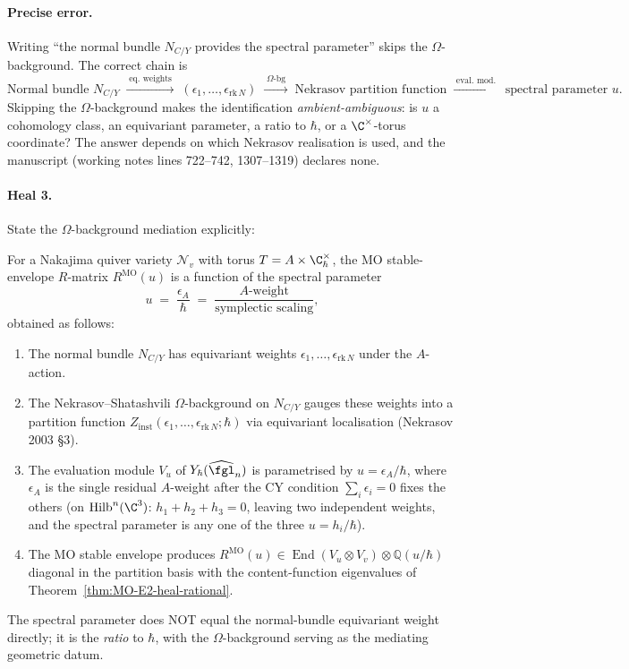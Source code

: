 \paragraph{Precise error.}  Writing ``the normal bundle $N_{C/Y}$
provides the spectral parameter'' skips the $\Omega$-background.
The correct chain is
\[
\text{Normal bundle } N_{C/Y} \;\xrightarrow{\;\text{eq.\ weights}\;}\;
(\epsilon_1, \ldots, \epsilon_{\mathrm{rk}\,N})
\;\xrightarrow{\;\Omega\text{-bg}\;}\;
\text{Nekrasov partition function}
\;\xrightarrow{\;\text{eval.\ mod.}\;}\;
\text{spectral parameter } u.
\]
Skipping the $\Omega$-background makes the identification
\emph{ambient-ambiguous}: is $u$ a cohomology class, an equivariant
parameter, a ratio to $\hbar$, or a $\C^\times$-torus coordinate?
The answer depends on which Nekrasov realisation is used, and the
manuscript (working notes lines 722--742, 1307--1319) declares none.

\paragraph{Heal 3.}  State the $\Omega$-background mediation
explicitly:

\begin{theorem}
\label{thm:MO-omega-spectral-heal}
For a Nakajima quiver variety $\mathcal N_v$ with torus
$T = A\times\C^\times_\hbar$, the MO stable-envelope $R$-matrix
$R^{\mathrm{MO}}(u)$ is a function of the spectral parameter
\[
u \;=\;\frac{\epsilon_A}{\hbar}\;=\;\frac{\text{$A$-weight}}
 {\text{symplectic scaling}},
\]
obtained as follows:
\begin{enumerate}[label=\textup{(\roman*)}]
\item The normal bundle $N_{C/Y}$ has equivariant weights
$\epsilon_1, \ldots, \epsilon_{\mathrm{rk}\,N}$ under the
$A$-action.
\item The Nekrasov--Shatashvili $\Omega$-background on
$N_{C/Y}$ gauges these weights into a partition function
$Z_{\mathrm{inst}}(\epsilon_1, \ldots, \epsilon_{\mathrm{rk}\,N};
\hbar)$ via equivariant localisation (Nekrasov 2003 \S3).
\item The evaluation module $V_u$ of $Y_\hbar(\widehat{\fgl}_n)$
is parametrised by $u = \epsilon_A/\hbar$, where $\epsilon_A$ is
the single residual $A$-weight after the CY condition
$\sum_i\epsilon_i = 0$ fixes the others (on $\mathrm{Hilb}^n(\C^3)$:
$h_1 + h_2 + h_3 = 0$, leaving two independent weights, and the
spectral parameter is any one of the three $u = h_i/\hbar$).
\item The MO stable envelope produces
$R^{\mathrm{MO}}(u)\in\operatorname{End}(V_u\otimes V_v)\otimes\mathbb Q(u/\hbar)$
diagonal in the partition basis with the content-function
eigenvalues of Theorem~\ref{thm:MO-E2-heal-rational}.
\end{enumerate}
The spectral parameter does NOT equal the normal-bundle equivariant
weight directly; it is the \emph{ratio} to $\hbar$, with the
$\Omega$-background serving as the mediating geometric datum.
\end{theorem}

